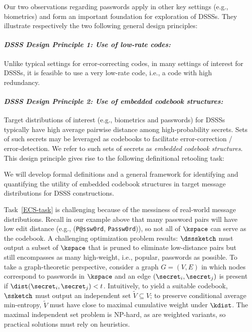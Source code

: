 Our two observations regarding passwords apply in other key settings (e.g.,
biometrics) and form an important foundation for exploration of DSSSs. They
illustrate respectively the two following general design principles:

\paragraph{\em DSSS Design Principle 1: Use of low-rate codes:} Unlike typical
settings for error-correcting codes, in many
settings of interest for DSSSs, it is feasible to use a very low-rate code,
i.e., a code with high redundancy. 

\paragraph{\em DSSS Design Principle 2: Use of embedded codebook structures:}
Target distributions of interest (e.g., biometrics and passwords) for DSSSs
typically have high average pairwise distance among high-probability secrets.
Sets of such secrets may be leveraged as codebooks to facilitate
error-correction / error-detection. We refer to such sets
of secrets as {\em embedded codebook structures}. 
This design principle gives rise to the following definitional retooling task:

\begin{task}
\label{ECS-task}
We will develop formal definitions and a general framework for identifying and quantifying the utility of embedded codebook structures in target message distributions for DSSS constructions.
\end{task}

Task~\ref{ECS-task} is challenging because of the messiness of real-world
message distributions. Recall in our example above that many password pairs will have low 
edit distance (e.g., ({\tt P@ssw0rd}, {\tt Passw0rd})), so not all
of $\kspace$ can serve as the codebook. 
A challenging optimization problem results: $\dsssketch$ must
output a subset of $\kspace$ that is pruned to eliminate low-distance pairs but
still encompasses as many high-weight, i.e., popular, passwords as possible. To
take a graph-theoretic perspective, consider a graph $G = (V,E)$ in which nodes
correspond to passwords in $\kspace$ and an edge $(\secret_i, \secret_j)$ is
present if $\dist(\secret_i, \secret_j) < t$. Intuitively, to yield a suitable
codebook, $\ssketch$ must output an independent set $\tilde{V} \subseteq V$; to preserve
conditional average min-entropy, $\tilde{V}$ must have close to maximal cumulative
weight under $\kdist$.  The maximal independent set problem is NP-hard, as  are
weighted variants, so practical solutions must rely on heuristics.

